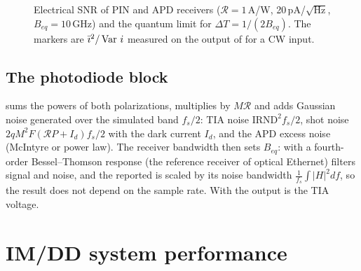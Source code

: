 \begin{figure}[htbp]
\centering
{}
\caption{Electrical SNR of PIN and APD receivers ($\mathcal R=1$\,A/W, 20\,pA/$\sqrt{\mathrm{Hz}}$, $B_{eq}=10$\,GHz) and the
quantum limit for $\Delta T=1/(2B_{eq})$. The markers are $\bar\imath^2/\operatorname{Var}\,i$ measured on the output of
 for a CW input.}
\label{fig:snr-receivers}
\end{figure}

\subsection{The photodiode block}
 sums the powers of both polarizations, multiplies by $M\mathcal R$ and adds Gaussian
noise generated over the simulated band $f_s/2$: TIA noise $\mathrm{IRND}^2f_s/2$, shot noise
$2qM^2F(\mathcal RP+I_d)f_s/2$ with the dark current $I_d$, and the APD excess noise (McIntyre or power
law). The receiver bandwidth then sets $B_{eq}$: with  a fourth-order
Bessel--Thomson response (the reference receiver of optical Ethernet) filters signal and noise,
and the reported  is scaled by its noise bandwidth $\frac1{f_s}\int|H|^2df$, so the result
does not depend on the sample rate. With  the output is the TIA voltage.

\section{IM/DD system performance}\label{sec:imdd}
